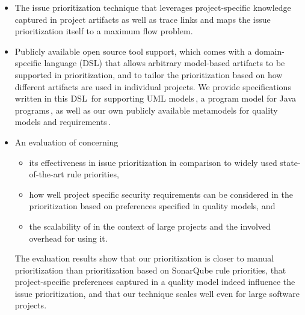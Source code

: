 \begin{itemize}
    \item The \appr{} issue prioritization technique that leverages project-specific knowledge captured in project artifacts as well as trace links and maps the issue prioritization itself to a maximum flow problem.


    \item Publicly available open source tool support, which comes with a domain-specific language (DSL) that allows arbitrary model-based artifacts to be supported in prioritization, and to tailor the prioritization based on how different artifacts are used in individual projects. We provide specifications written in this DSL\,\cite{fowler2010domain,dsl}
    for supporting UML models\,\cite{uml}, a program model for Java programs\,\cite{peldszus2016continuous,Peldszus2022}, as well as our own publicly available metamodels for quality models and requirements\,\cite{replication}.

    \item An evaluation of \appr{} concerning
    \begin{itemize}
        \item its effectiveness in issue prioritization in comparison to widely used state-of-the-art rule priorities,
        \item how well project specific security requirements can be considered in the prioritization based on preferences specified in quality models, and
        \item the scalability of \appr{} in the context of large projects and the involved overhead for using it.
    \end{itemize}

    The evaluation results show that our prioritization is closer to manual prioritization than prioritization based on SonarQube rule priorities, that project-specific preferences captured in a quality model indeed influence the issue prioritization, and that our technique scales well even for large software projects.
\end{itemize}

